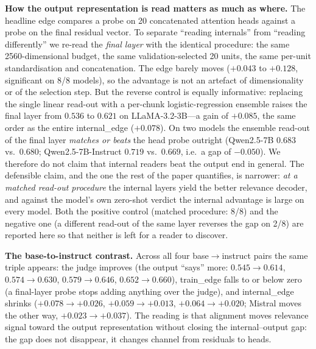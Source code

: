 \documentclass[11pt]{article}
\begin{document}
\textbf{How the output representation is read matters as much as where.}
The headline edge compares a probe on 20 concatenated attention heads against a
probe on the final residual vector. To separate ``reading internals'' from
``reading differently'' we re-read the \emph{final layer} with the identical
procedure: the same 2560-dimensional budget, the same validation-selected 20
units, the same per-unit standardisation and concatenation. The edge barely
moves ($+0.043$ to $+0.128$, significant on 8/8 models), so the advantage is
not an artefact of dimensionality or of the selection step. But the reverse
control is equally informative: replacing the single linear read-out with a
per-chunk logistic-regression ensemble raises the final layer from $0.536$ to
$0.621$ on LLaMA-3.2-3B---a gain of $+0.085$, the same order as the entire
internal\_edge ($+0.078$). On two models the ensemble read-out of the final
layer \emph{matches or beats} the head probe outright (Qwen2.5-7B $0.683$ vs.\
$0.680$; Qwen2.5-7B-Instruct $0.719$ vs.\ $0.669$, i.e.\ a gap of $-0.050$).
We therefore do not claim that internal readers beat the output end in general.
The defensible claim, and the one the rest of the paper quantifies, is narrower:
\emph{at a matched read-out procedure} the internal layers yield the better
relevance decoder, and against the model's own zero-shot verdict the internal
advantage is large on every model. Both the positive control (matched
procedure: 8/8) and the negative one (a different read-out of the same layer
reverses the gap on 2/8) are reported here so that neither is left for a reader
to discover.

\textbf{The base-to-instruct contrast.} Across all four base$\to$instruct pairs
the same triple appears: the judge improves (the output ``says'' more:
$0.545{\to}0.614$, $0.574{\to}0.630$, $0.579{\to}0.646$, $0.652{\to}0.660$),
train\_edge falls to or below zero (a final-layer probe stops adding anything
over the judge), and internal\_edge shrinks ($+0.078{\to}+0.026$,
$+0.059{\to}+0.013$, $+0.064{\to}+0.020$; Mistral moves the other way,
$+0.023{\to}+0.037$). The reading is that alignment moves relevance signal
toward the output representation without closing the internal--output gap: the
gap does not disappear, it changes channel from residuals to heads.
\end{document}

